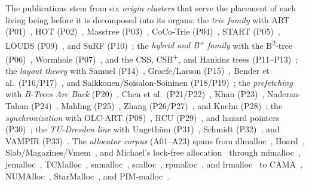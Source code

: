 \begin{nurkurz}
The publications stem from six \emph{origin clusters} that serve the placement of each living being before
it is decomposed into its organs: the \emph{trie family} with ART (P01)~\cite{leis2013art}, HOT
(P02)~\cite{binna2018hot}, Masstree (P03)~\cite{mao2012masstree}, CoCo-Trie (P04)~\cite{boffa2024coco},
START (P05)~\cite{fent2020start}, LOUDS (P09)~\cite{jacobson1989louds}, and SuRF (P10)~\cite{zhang2018surf};
the \emph{hybrid and B\textsuperscript{+} family} with the B\textsuperscript{2}-tree
(P06)~\cite{schmeisser2022b2tree}, Wormhole (P07)~\cite{wu2019wormhole}, and the CSS, CSB\textsuperscript{+},
and Hankins trees (P11--P13)~\cite{rao1999css,rao2000csb,hankins2003nodesize}; the \emph{layout theory} with
Samuel (P14)~\cite{samuel2005procaware}, Graefe/Larson (P15)~\cite{graefe2001btree}, Bender et
al.\ (P16/P17)~\cite{bender2000cobtree,bender2005coboblivious,bender2002treelayout,bender2002scanning,bender2002orderlist},
and Saikkonen/Soisalon-Soininen (P18/P19)~\cite{saikkonen2008multilevel,saikkonen2016layout}; the
\emph{prefetching} with \emph{B-Trees Are Back} (P20)~\cite{mueller2025btreesback}, Chen et
al.\ (P21/P22)~\cite{chen2001prefetch,chen2002fractal}, Khan (P23)~\cite{khan2010adaptive}, Naderan-Tahan
(P24)~\cite{naderan2016adaptivefilter}, Mahling (P25)~\cite{mahling2025hotpath}, Zhang
(P26/P27)~\cite{zhang2024pathprefix,zhang2025hierarchical}, and Kuehn (P28)~\cite{kuehn2023bplustree}; the
\emph{synchronization} with OLC-ART (P08)~\cite{leis2016olc}, RCU (P29)~\cite{mckenney2001rcu}, and hazard
pointers (P30)~\cite{michael2004hazard}; the \emph{TU-Dresden line} with Ungeth\"{u}m
(P31)~\cite{ungethuem2017survey}, Schmidt (P32)~\cite{schmidt2025hbm}, and VAMPIR
(P33)~\cite{berthold2023vampir}. The \emph{allocator corpus} (A01--A23) spans from
dlmalloc~\cite{lea1996dlmalloc}, Hoard~\cite{berger2000hoard},
Slab/Magazines/Vmem~\cite{bonwick1994slab,bonwick2001vmem}, and Michael's lock-free
allocation~\cite{michael2004lockfree} through mimalloc~\cite{leijen2019mimalloc},
jemalloc~\cite{evans2006jemalloc}, TCMalloc~\cite{ghemawat2005tcmalloc}, snmalloc~\cite{lietar2019snmalloc},
scalloc~\cite{aigner2015scalloc}, rpmalloc~\cite{jansson2017rpmalloc}, and lrmalloc~\cite{leite2018lrmalloc}
to CAMA~\cite{herter2011cama}, NUMAlloc~\cite{yang2023numalloc}, StarMalloc~\cite{reitz2024starmalloc}, and
PIM-malloc~\cite{pimmalloc2026}.
\end{nurkurz}

